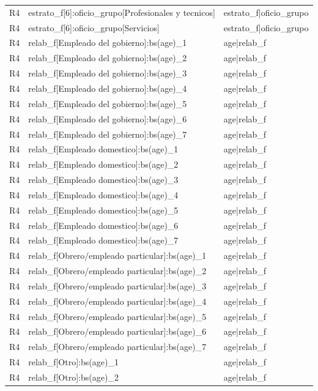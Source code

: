 \begin{longtable}{lll}
R4 & estrato\_f[6]:oficio\_grupo[Profesionales y tecnicos] & estrato\_f|oficio\_grupo \\
R4 & estrato\_f[6]:oficio\_grupo[Servicios] & estrato\_f|oficio\_grupo \\
R4 & relab\_f[Empleado del gobierno]:bs(age)\_1 & age|relab\_f \\
R4 & relab\_f[Empleado del gobierno]:bs(age)\_2 & age|relab\_f \\
R4 & relab\_f[Empleado del gobierno]:bs(age)\_3 & age|relab\_f \\
R4 & relab\_f[Empleado del gobierno]:bs(age)\_4 & age|relab\_f \\
R4 & relab\_f[Empleado del gobierno]:bs(age)\_5 & age|relab\_f \\
R4 & relab\_f[Empleado del gobierno]:bs(age)\_6 & age|relab\_f \\
R4 & relab\_f[Empleado del gobierno]:bs(age)\_7 & age|relab\_f \\
R4 & relab\_f[Empleado domestico]:bs(age)\_1 & age|relab\_f \\
R4 & relab\_f[Empleado domestico]:bs(age)\_2 & age|relab\_f \\
R4 & relab\_f[Empleado domestico]:bs(age)\_3 & age|relab\_f \\
R4 & relab\_f[Empleado domestico]:bs(age)\_4 & age|relab\_f \\
R4 & relab\_f[Empleado domestico]:bs(age)\_5 & age|relab\_f \\
R4 & relab\_f[Empleado domestico]:bs(age)\_6 & age|relab\_f \\
R4 & relab\_f[Empleado domestico]:bs(age)\_7 & age|relab\_f \\
R4 & relab\_f[Obrero/empleado particular]:bs(age)\_1 & age|relab\_f \\
R4 & relab\_f[Obrero/empleado particular]:bs(age)\_2 & age|relab\_f \\
R4 & relab\_f[Obrero/empleado particular]:bs(age)\_3 & age|relab\_f \\
R4 & relab\_f[Obrero/empleado particular]:bs(age)\_4 & age|relab\_f \\
R4 & relab\_f[Obrero/empleado particular]:bs(age)\_5 & age|relab\_f \\
R4 & relab\_f[Obrero/empleado particular]:bs(age)\_6 & age|relab\_f \\
R4 & relab\_f[Obrero/empleado particular]:bs(age)\_7 & age|relab\_f \\
R4 & relab\_f[Otro]:bs(age)\_1 & age|relab\_f \\
R4 & relab\_f[Otro]:bs(age)\_2 & age|relab\_f \\

\end{longtable}

